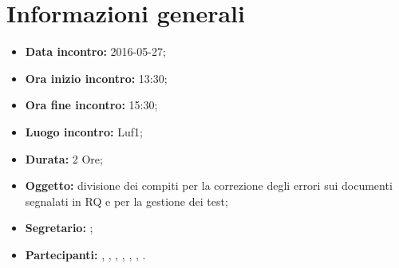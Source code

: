 \newpage
\section{Informazioni generali}
\begin{itemize}
\item \textbf{Data incontro:} 2016-05-27;
\item \textbf{Ora inizio incontro:} 13:30;
\item \textbf{Ora fine incontro:} 15:30;
\item \textbf{Luogo incontro:} Luf1;
\item \textbf{Durata:} 2 Ore;
\item \textbf{Oggetto:} divisione dei compiti per la correzione degli errori sui documenti segnalati in RQ e per la gestione dei test;
\item \textbf{Segretario:} \GR;
\item \textbf{Partecipanti:} \AF, \FB, \GN, \GR, \MV, \MP, \SM.

\end{itemize}
